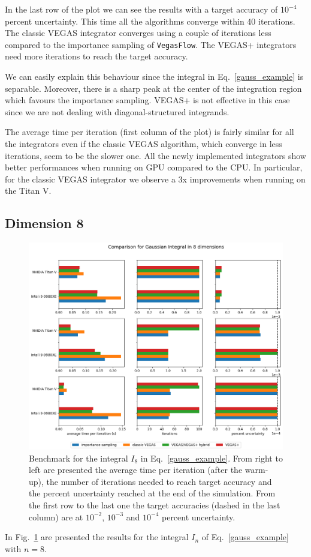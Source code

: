 \documentclass[../main/main.tex]{subfiles}
\begin{document}
In the last row of the plot we can see the results with a target accuracy of $10^{-4}$ percent uncertainty. 
This time all the algorithms converge within 40 iterations. The classic VEGAS integrator converges using a couple of  iterations less compared to the importance sampling of \texttt{VegasFlow}. The VEGAS+ integrators need more iterations to reach the target accuracy.

We can easily explain this behaviour since the integral in Eq.~\ref{gauss_example} is separable. Moreover, there is a sharp peak at the center of the integration region which favours the importance sampling. VEGAS+ is not effective in this case since we are not dealing with diagonal-structured integrands.

The average time per iteration (first column of the plot) is fairly similar for all the integrators even if the classic VEGAS algorithm, which converge in less iterations, seem to be the slower one. All the newly implemented integrators show better performances when running on GPU compared to the CPU. In particular, for the classic VEGAS integrator we observe a 3x improvements when running on the Titan V.
\subsection{Dimension 8}
\begin{figure}
	\centering
	\includegraphics[width=\textwidth]{../images/gauss8d_final.png}
	\caption{Benchmark  for the integral $I_8$ in Eq.~\ref{gauss_example}. From right to left are presented the average time per iteration (after the warm-up), the number of iterations needed to reach target accuracy and the percent uncertainty reached at the end of the simulation. From the first row to the last one the target accuracies (dashed in the last column) are at $10^{-2}$, $10^{-3}$ and $10^{-4}$ percent uncertainty.}
	\label{gauss8d}
\end{figure}
In Fig.~\ref{gauss8d} are presented the results for the integral $I_n$ of Eq.~\ref{gauss_example} with $n = 8$.
\end{document}
